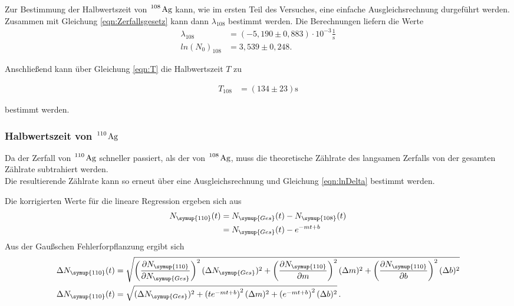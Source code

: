 Zur Bestimmung der Halbwertszeit von $\ce{^108 Ag}$ kann, wie im ersten Teil des Versuches, eine einfache Ausgleichsrechnung durgeführt werden. Zusammen mit
Gleichung \eqref{eqn:Zerfallsgesetz} kann dann $\lambda_{108}$ bestimmt werden. Die Berechnungen liefern die Werte
\begin{align*}
  \lambda_{108} &= (-5,190 \pm 0,883) \cdot 10^{-3} \frac{1}{\si{\second}} \\
  ln(N_0)_{108} &=  3,539 \pm 0,248.
\end{align*}

Anschließend kann über Gleichung \eqref{eqn:T} die Halbwertszeit $T$ zu

\begin{align*}
  T_{108} &= (134 \pm 23) \si{\second}
\end{align*}

bestimmt werden.


\subsubsection{Halbwertszeit von $\ce{^110 Ag}$}

Da der Zerfall von $\ce{^110 Ag}$ schneller passiert, als der von $\ce{^108 Ag}$, muss die theoretische Zählrate des langsamen Zerfalls von der gesamten Zählrate
subtrahiert werden.\\
Die resultierende Zählrate kann so erneut über eine Ausgleichsrechnung und Gleichung \eqref{eqn:lnDelta} bestimmt werden.



Die korrigierten Werte für die lineare Regression ergeben sich aus
\begin{align*}
  N_{\symup{110}}(t) &= N_{\symup{Ges}}(t) - N_{\symup{108}}(t) \\
                      &= N_{\symup{Ges}}(t) - e^{-mt + b}
\end{align*}
Aus der Gaußschen Fehlerforpflanzung ergibt sich
\begin{align*}
  \Delta N_{\symup{110}}(t) &= \sqrt{
    \left(\frac{\partial N_{\symup{110}}}{\partial N_{\symup{Ges}}}\right)^2 (\Delta N_{\symup{Ges}})^2 +
    \left(\frac{\partial N_{\symup{110}}}{\partial m}\right)^2 (\Delta m)^2 + 
    \left(\frac{\partial N_{\symup{110}}}{\partial b}\right)^2 (\Delta b)^2} \\
  \Delta N_{\symup{110}}(t) &= \sqrt{
    (\Delta N_{\symup{Ges}})^2 +
    \left(te^{-mt+b}\right)^2 (\Delta m)^2 +
    \left(e^{-mt+b}\right)^2 (\Delta b)^2
  }\,. \\
\end{align*}




